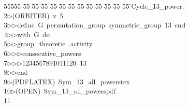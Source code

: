 %
%
\begin{tabbing}
55555 \= 55 \= 55 \= 55 \= 55 \= 55 \= 55 \= 55 \= 55 \= 55 \= 55 \= 55 \= 55 \= \>Cycle\_13\_power:\\[0pt]
2\>$\triangleright$\>(ORBITER)\ v\ 5\ \\[0pt]
3\>$\triangleright$\>$\triangleright$\>define\ G\ permutation\_group\ symmetric\_group\ 13\ end\ \\[0pt]
4\>$\triangleright$\>$\triangleright$\>with\ G\ do\ \\[0pt]
5\>$\triangleright$\>$\triangleright$\>group\_theoretic\_activity\ \\[0pt]
6\>$\triangleright$\>$\triangleright$\>$\triangleright$\>consecutive\_powers\ \\[0pt]
7\>$\triangleright$\>$\triangleright$\>$\triangleright$\>1234567891011120\ 13\ \\[0pt]
8\>$\triangleright$\>$\triangleright$\>end\\[0pt]
9\>$\triangleright$\>(PDFLATEX)\ Sym\_13\_all\_powerstex\\[0pt]
10\>$\triangleright$\>(OPEN)\ Sym\_13\_all\_powerspdf\\[0pt]
11\>\end{tabbing}
